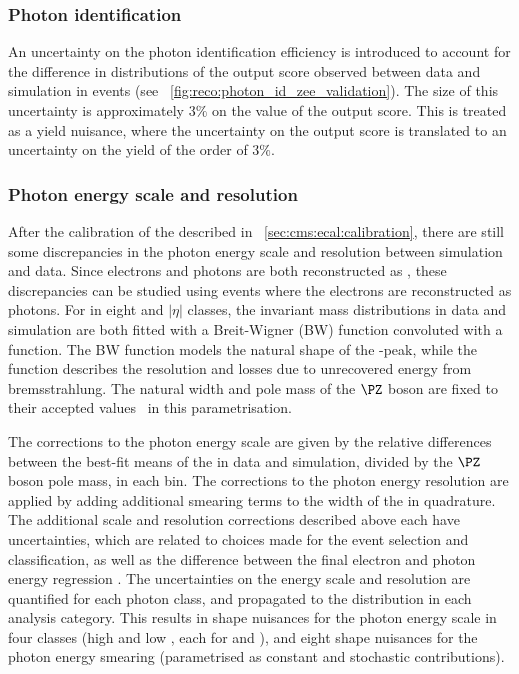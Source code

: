 \subsubsection{Photon identification}
An uncertainty on the photon identification efficiency is introduced to account for the difference in distributions of the \PhoIdBdt output score observed between data and simulation in \Zee events (see \Fig~\ref{fig:reco:photon_id_zee_validation}). The size of this uncertainty is approximately $3\%$ on the value of the output score. This is treated as a yield nuisance, where the uncertainty on the output score is translated to an uncertainty on the yield of the order of $3\%$. 

\subsubsection{Photon energy scale and resolution}
After the calibration of the \ECAL described in \Sec~\ref{sec:cms:ecal:calibration}, there are still some discrepancies in the photon energy scale and resolution between simulation and data. Since electrons and photons are both reconstructed as \SC\s, these discrepancies can be studied using \Zee events where the electrons are reconstructed as photons.
For \SC\s in eight \RNINE and $|\eta|$ classes, the invariant mass distributions in data and simulation are both fitted with a Breit-Wigner (BW) function convoluted with a \CB function. The BW function models the natural shape of the \PZ-peak, while the \CB function describes the \ECAL resolution and losses due to unrecovered energy from bremsstrahlung. The natural width and pole mass of the $\PZ$ boson are fixed to their accepted values~\cite{PDGBooklet} in this parametrisation. 

The corrections to the photon energy scale are given by the relative differences between the best-fit means of the \CB in data and simulation, divided by the $\PZ$ boson pole mass, in each bin. The corrections to the photon energy resolution are applied by adding additional smearing terms to the width of the \CB in quadrature. The additional scale and resolution corrections described above each have uncertainties, which are related to choices made for the \Zee event selection and classification, as well as the difference between the final electron and photon energy regression \BDT\s. The uncertainties on the energy scale and resolution are quantified for each photon class, and propagated to the \mgg distribution in each analysis category. This results in shape nuisances for the photon energy scale in four classes (high and low \RNINE, each for \EB and \EE), and eight shape nuisances for the photon energy smearing (parametrised as constant and stochastic contributions). 


